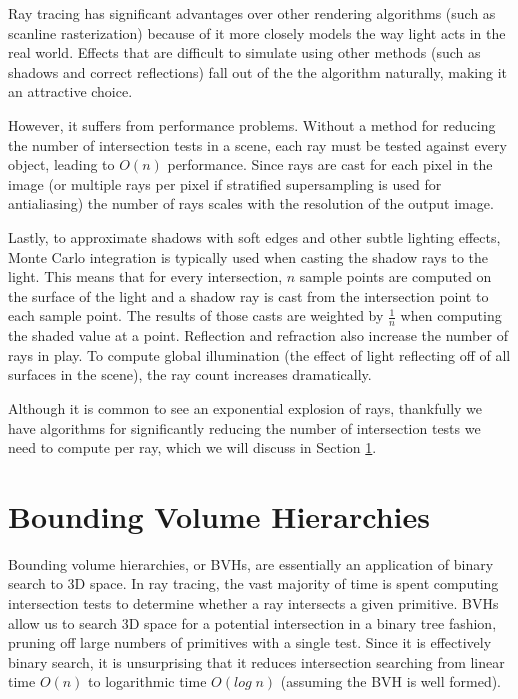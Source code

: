 \documentclass[12pt]{ucthesis}
\begin{document}
Ray tracing has significant advantages over other rendering algorithms (such
as scanline rasterization) because of it more closely models the way light acts
in the real world. Effects that are difficult to simulate using other methods
(such as shadows and correct reflections) fall out of the the algorithm naturally,
making it an attractive choice.

However, it suffers from performance problems. Without a method for reducing
the number of intersection tests in a scene, each ray must be tested against
every object, leading to $O(n)$ performance. Since rays are cast for each pixel
in the image (or multiple rays per pixel if stratified supersampling is used
for antialiasing) the number of rays scales with the resolution of the output
image.

Lastly, to approximate shadows with soft edges and other subtle lighting effects,
Monte Carlo integration is typically used when casting the shadow rays to the light.
This means that for every intersection, $n$ sample points are computed on the surface
of the light and a shadow ray is cast from the intersection point to each sample
point. The results of those casts are weighted by $\frac{1}{n}$ when computing the
shaded value at a point. Reflection and refraction also increase the number of
rays in play. To compute global illumination (the effect of light reflecting off
of all surfaces in the scene), the ray count increases dramatically.

Although it is common to see an exponential explosion of rays, thankfully we
have algorithms for significantly reducing the number of intersection tests we
need to compute per ray, which we will discuss in Section \ref{bvhs}.

\section{Bounding Volume Hierarchies}
\label{bvhs}

Bounding volume hierarchies, or BVHs, are essentially an application of binary
search to 3D space. In ray tracing, the vast majority of time is spent
computing intersection tests to determine whether a ray intersects a given
primitive. BVHs allow us to search 3D space for a potential intersection in a
binary tree fashion, pruning off large numbers of primitives with a single
test. Since it is effectively binary search, it is unsurprising that it reduces
intersection searching from linear time $O(n)$ to logarithmic time $O(log\;n)$
(assuming the BVH is well formed).
\end{document}
